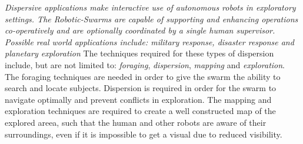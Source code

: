 
  \emph{Dispersive applications make interactive use of autonomous robots in exploratory settings. The Robotic-Swarms are capable of supporting and enhancing operations co-operatively and are optionally coordinated by a single human supervisor. Possible real world applications include: military response, disaster response and planetary exploration}\cite{ludwig2006robotic,Penders2011}
    The techniques required for these types of dispersion include, but are not limited to: \emph{foraging}, \emph{dispersion}, \emph{mapping}  and \emph{exploration}.\cite{morlok2007dispersing,Penders2011,mclurkin2007distributed} The foraging techniques are needed in order to give the swarm the ability to search and locate subjects. Dispersion is required in order for the swarm to navigate optimally and prevent conflicts in exploration. The mapping and exploration techniques are required to create a well constructed map of the explored areea, such that the human and other robots are aware of their surroundings, even if it is impossible to get a visual due to reduced visibility.\cite{morlok2007dispersing}
    